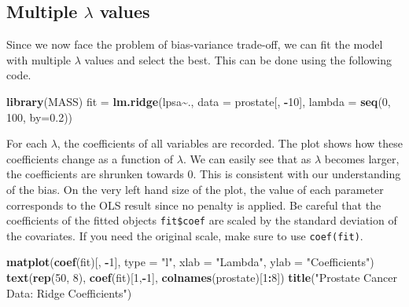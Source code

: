 \documentclass[
]{book}
\newenvironment{Shaded}{\begin{snugshade}}{\end{snugshade}}
\newcommand{\AttributeTok}[1]{\textcolor[rgb]{0.13,0.29,0.53}{#1}}
\newcommand{\DecValTok}[1]{\textcolor[rgb]{0.00,0.00,0.81}{#1}}
\newcommand{\FloatTok}[1]{\textcolor[rgb]{0.00,0.00,0.81}{#1}}
\newcommand{\FunctionTok}[1]{\textcolor[rgb]{0.13,0.29,0.53}{\textbf{#1}}}
\newcommand{\NormalTok}[1]{#1}
\newcommand{\OtherTok}[1]{\textcolor[rgb]{0.56,0.35,0.01}{#1}}
\newcommand{\SpecialCharTok}[1]{\textcolor[rgb]{0.81,0.36,0.00}{\textbf{#1}}}
\newcommand{\StringTok}[1]{\textcolor[rgb]{0.31,0.60,0.02}{#1}}
\theoremstyle{definition}
\theoremstyle{definition}
\theoremstyle{definition}
\theoremstyle{definition}
\theoremstyle{remark}
\begin{document}
\hypertarget{multiple-lambda-values}{%
\subsection{\texorpdfstring{Multiple \(\lambda\) values}{Multiple \textbackslash lambda values}}\label{multiple-lambda-values}}

Since we now face the problem of bias-variance trade-off, we can fit the model with multiple \(\lambda\) values and select the best. This can be done using the following code.

\begin{Shaded}
\begin{Highlighting}[]
  \FunctionTok{library}\NormalTok{(MASS)}
\NormalTok{  fit }\OtherTok{=} \FunctionTok{lm.ridge}\NormalTok{(lpsa}\SpecialCharTok{\textasciitilde{}}\NormalTok{.,  }\AttributeTok{data =}\NormalTok{ prostate[, }\SpecialCharTok{{-}}\DecValTok{10}\NormalTok{], }\AttributeTok{lambda =} \FunctionTok{seq}\NormalTok{(}\DecValTok{0}\NormalTok{, }\DecValTok{100}\NormalTok{, }\AttributeTok{by=}\FloatTok{0.2}\NormalTok{))}
\end{Highlighting}
\end{Shaded}

For each \(\lambda\), the coefficients of all variables are recorded. The plot shows how these coefficients change as a function of \(\lambda\). We can easily see that as \(\lambda\) becomes larger, the coefficients are shrunken towards 0. This is consistent with our understanding of the bias. On the very left hand size of the plot, the value of each parameter corresponds to the OLS result since no penalty is applied. Be careful that the coefficients of the fitted objects \texttt{fit\$coef} are scaled by the standard deviation of the covariates. If you need the original scale, make sure to use \texttt{coef(fit)}.

\begin{Shaded}
\begin{Highlighting}[]
    \FunctionTok{matplot}\NormalTok{(}\FunctionTok{coef}\NormalTok{(fit)[, }\SpecialCharTok{{-}}\DecValTok{1}\NormalTok{], }\AttributeTok{type =} \StringTok{"l"}\NormalTok{, }\AttributeTok{xlab =} \StringTok{"Lambda"}\NormalTok{, }\AttributeTok{ylab =} \StringTok{"Coefficients"}\NormalTok{)}
    \FunctionTok{text}\NormalTok{(}\FunctionTok{rep}\NormalTok{(}\DecValTok{50}\NormalTok{, }\DecValTok{8}\NormalTok{), }\FunctionTok{coef}\NormalTok{(fit)[}\DecValTok{1}\NormalTok{,}\SpecialCharTok{{-}}\DecValTok{1}\NormalTok{], }\FunctionTok{colnames}\NormalTok{(prostate)[}\DecValTok{1}\SpecialCharTok{:}\DecValTok{8}\NormalTok{])}
    \FunctionTok{title}\NormalTok{(}\StringTok{"Prostate Cancer Data: Ridge Coefficients"}\NormalTok{)}
\end{Highlighting}
\end{Shaded}
\end{document}

